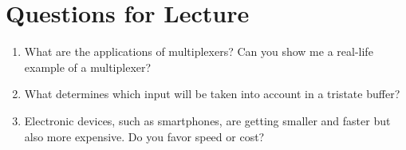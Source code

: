 \documentclass[12pt]{article}
\begin{document}
\section{Questions for Lecture}

\begin{enumerate}
    \item What are the applications of multiplexers? Can you show me a real-life example of a multiplexer?
    \item What determines which input will be taken into account in a tristate buffer?
    \item Electronic devices, such as smartphones, are getting smaller and faster but also more expensive. Do you favor speed or cost?
\end{enumerate}



\end{document}
